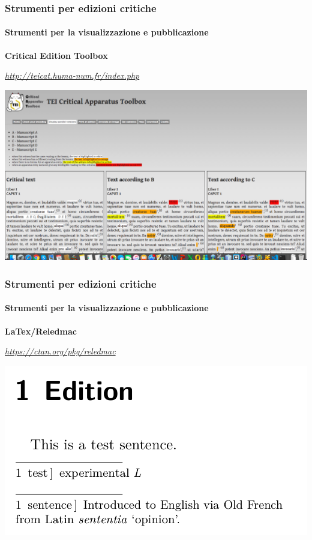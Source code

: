 \begin{frame}
    \frametitle{Strumenti per edizioni critiche}
    \framesubtitle{Strumenti per la visualizzazione e pubblicazione}
	\addtocounter{nframe}{1}
    \begin{center}
        \textbf{Critical Edition Toolbox}
    \end{center}
    \begin{center}
        \textit{\url{http://teicat.huma-num.fr/index.php}}
	\end{center}
    \begin{center}
        \includegraphics[width=.95\textwidth]{imgs/TEI-critical-app-toolbox.png}
	\end{center}
\end{frame}

\begin{frame}
    \frametitle{Strumenti per edizioni critiche}
    \framesubtitle{Strumenti per la visualizzazione e pubblicazione}
	\addtocounter{nframe}{1}
    \begin{center}
        \textbf{LaTex/Reledmac}
    \end{center}
    \begin{center}
        \textit{\url{https://ctan.org/pkg/reledmac}}
	\end{center}
    \begin{center}
        \includegraphics[width=.95\textwidth]{imgs/reledmac-test.png}
	\end{center}
\end{frame}

